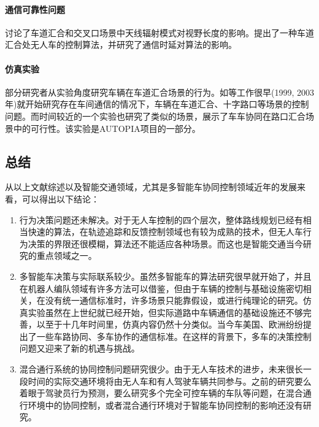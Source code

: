     \paragraph{通信可靠性问题}
    \cite{Abbas2013Radio}讨论了车道汇合和交叉口场景中天线辐射模式对视野长度的影响。\cite{Uno1999A}提出了一种车道汇合处无人车的控制算法，并研究了通信时延对算法的影响。
    \paragraph{仿真实验}
    部分研究者从实验角度研究车辆在车道汇合场景的行为。如\cite{Sakaguchi1999Inter,Kolodko2003Cooperative}等工作很早(1999, 2003年)就开始研究存在车间通信的情况下，车辆在车道汇合、十字路口等场景的控制问题。而时间较近的一个实验\cite{Milanes2011Automated}也研究了类似的场景，展示了车车协同在路口汇合场景中的可行性。该实验是AUTOPIA\cite{Milan2011AUTOPIA}项目的一部分。

  \subsection{总结}
  从以上文献综述以及智能交通领域，尤其是多智能车协同控制领域近年的发展来看，可以得出以下结论：

  \begin{enumerate}[label=(\arabic*)]
  \item 行为决策问题还未解决。对于无人车控制的四个层次，整体路线规划已经有相当快速的算法，在轨迹追踪和反馈控制领域也有较为成熟的技术，但无人车行为决策的界限还很模糊，算法还不能适应各种场景。而这也是智能交通当今研究的重点领域之一。
  \item 多智能车决策与实际联系较少。虽然多智能车的算法研究很早就开始了，并且在机器人编队领域有许多方法可以借鉴，但由于车辆的控制与基础设施密切相关，在没有统一通信标准时，许多场景只能靠假设，或进行纯理论的研究。仿真实验虽然在上世纪就已经开始，但实际道路中车辆通信的基础设施还不够完善，以至于十几年时间里，仿真内容仍然十分类似。当今车美国、欧洲纷纷提出了一些车路协同、多车协作的通信标准\cite{Chen2014Cooperative}。在这样的背景下，多车的决策控制问题又迎来了新的机遇与挑战。
  \item 混合通行系统的协同控制问题研究很少。由于无人车技术的进步，未来很长一段时间的实际交通环境将由无人车和有人驾驶车辆共同参与。之前的研究要么着眼于驾驶员行为预测，要么研究多个完全可控车辆的车队等问题，在混合通行环境中的协同控制，或者混合通行环境对于智能车协同控制的影响还没有研究。
  \end{enumerate}

